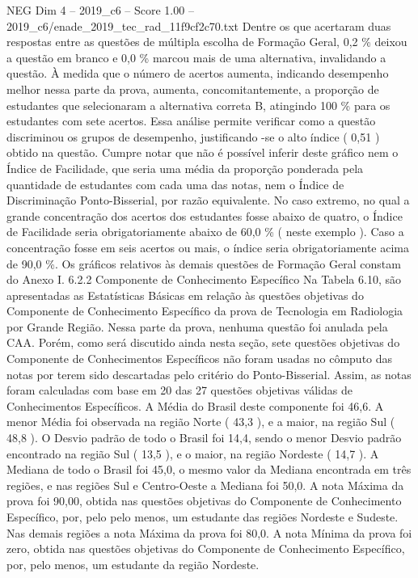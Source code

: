 \begin{textsample}{NEG Dim 4 – 2019\_c6 – Score 1.00 – 2019\_c6/enade\_2019\_tec\_rad\_11f9cf2c70.txt}
Dentre os que acertaram duas respostas entre as questões de múltipla escolha de Formação Geral, 0,2 \% deixou a questão em branco e 0,0 \% marcou mais de uma alternativa, invalidando a questão.
À medida que o número de acertos aumenta, indicando desempenho melhor nessa parte da prova, aumenta, concomitantemente, a proporção de estudantes que selecionaram a alternativa correta B, atingindo 100 \% para os estudantes com sete acertos.
Essa análise permite verificar como a questão discriminou os grupos de desempenho, justificando -se o alto índice ( 0,51 ) obtido na questão.
Cumpre notar que não é possível inferir deste gráfico nem o Índice de Facilidade, que seria uma média da proporção ponderada pela quantidade de estudantes com cada uma das notas, nem o Índice de Discriminação Ponto-Bisserial, por razão equivalente.
No caso extremo, no qual a grande concentração dos acertos dos estudantes fosse abaixo de quatro, o Índice de Facilidade seria obrigatoriamente abaixo de 60,0 \% ( neste exemplo ).
Caso a concentração fosse em seis acertos ou mais, o índice seria obrigatoriamente acima de 90,0 \%.
Os gráficos relativos às demais questões de Formação Geral constam do Anexo I. 6.2.2 Componente de Conhecimento Específico Na Tabela 6.10, são apresentadas as Estatísticas Básicas em relação às questões objetivas do Componente de Conhecimento Específico da prova de Tecnologia em Radiologia por Grande Região.
Nessa parte da prova, nenhuma questão foi anulada pela CAA.
Porém, como será discutido ainda nesta seção, sete questões objetivas do Componente de Conhecimentos Específicos não foram usadas no cômputo das notas por terem sido descartadas pelo critério do Ponto-Bisserial.
Assim, as notas foram calculadas com base em 20 das 27 questões objetivas válidas de Conhecimentos Específicos.
A Média do Brasil deste componente foi 46,6.
A menor Média foi observada na região Norte ( 43,3 ), e a maior, na região Sul ( 48,8 ).
O Desvio padrão de todo o Brasil foi 14,4, sendo o menor Desvio padrão encontrado na região Sul ( 13,5 ), e o maior, na região Nordeste ( 14,7 ).
A Mediana de todo o Brasil foi 45,0, o mesmo valor da Mediana encontrada em três regiões, e nas regiões Sul e Centro-Oeste a Mediana foi 50,0.
A nota Máxima da prova foi 90,00, obtida nas questões objetivas do Componente de Conhecimento Específico, por, pelo pelo menos, um estudante das regiões Nordeste e Sudeste.
Nas demais regiões a nota Máxima da prova foi 80,0.
A nota Mínima da prova foi zero, obtida nas questões objetivas do Componente de Conhecimento Específico, por, pelo menos, um estudante da região Nordeste.

\end{textsample}
